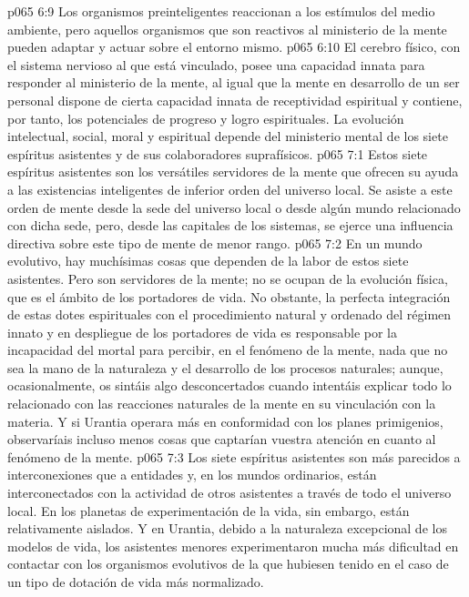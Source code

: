\vs p065 6:9 Los organismos preinteligentes reaccionan a los estímulos del medio ambiente, pero aquellos organismos que son reactivos al ministerio de la mente pueden adaptar y actuar sobre el entorno mismo.
\vs p065 6:10 El cerebro físico, con el sistema nervioso al que está vinculado, posee una capacidad innata para responder al ministerio de la mente, al igual que la mente en desarrollo de un ser personal dispone de cierta capacidad innata de receptividad espiritual y contiene, por tanto, los potenciales de progreso y logro espirituales. La evolución intelectual, social, moral y espiritual depende del ministerio mental de los siete espíritus asistentes y de sus colaboradores suprafísicos.
\vs p065 7:1 Estos siete espíritus asistentes son los versátiles servidores de la mente que ofrecen su ayuda a las existencias inteligentes de inferior orden del universo local. Se asiste a este orden de mente desde la sede del universo local o desde algún mundo relacionado con dicha sede, pero, desde las capitales de los sistemas, se ejerce una influencia directiva sobre este tipo de mente de menor rango.
\vs p065 7:2 En un mundo evolutivo, hay muchísimas cosas que dependen de la labor de estos siete asistentes. Pero son servidores de la mente; no se ocupan de la evolución física, que es el ámbito de los portadores de vida. No obstante, la perfecta integración de estas dotes espirituales con el procedimiento natural y ordenado del régimen innato y en despliegue de los portadores de vida es responsable por la incapacidad del mortal para percibir, en el fenómeno de la mente, nada que no sea la mano de la naturaleza y el desarrollo de los procesos naturales; aunque, ocasionalmente, os sintáis algo desconcertados cuando intentáis explicar todo lo relacionado con las reacciones naturales de la mente en su vinculación con la materia. Y si Urantia operara más en conformidad con los planes primigenios, observaríais incluso menos cosas que captarían vuestra atención en cuanto al fenómeno de la mente.
\vs p065 7:3 Los siete espíritus asistentes son más parecidos a interconexiones que a entidades y, en los mundos ordinarios, están interconectados con la actividad de otros asistentes a través de todo el universo local. En los planetas de experimentación de la vida, sin embargo, están relativamente aislados. Y en Urantia, debido a la naturaleza excepcional de los modelos de vida, los asistentes menores experimentaron mucha más dificultad en contactar con los organismos evolutivos de la que hubiesen tenido en el caso de un tipo de dotación de vida más normalizado.
